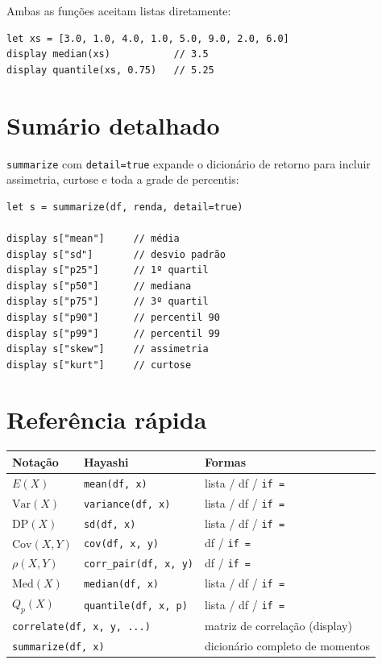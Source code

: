 Ambas as funções aceitam listas diretamente:

\begin{lstlisting}
let xs = [3.0, 1.0, 4.0, 1.0, 5.0, 9.0, 2.0, 6.0]
display median(xs)           // 3.5
display quantile(xs, 0.75)   // 5.25
\end{lstlisting}

\section{Sumário detalhado}

\lstinline{summarize} com \lstinline{detail=true} expande o dicionário de
retorno para incluir assimetria, curtose e toda a grade de percentis:

\begin{lstlisting}[caption={summarize com detail}]
let s = summarize(df, renda, detail=true)

display s["mean"]     // média
display s["sd"]       // desvio padrão
display s["p25"]      // 1º quartil
display s["p50"]      // mediana
display s["p75"]      // 3º quartil
display s["p90"]      // percentil 90
display s["p99"]      // percentil 99
display s["skew"]     // assimetria
display s["kurt"]     // curtose
\end{lstlisting}

\section{Referência rápida}

\begin{center}
\begin{tabular}{lll}
\toprule
\textbf{Notação} & \textbf{Hayashi} & \textbf{Formas} \\
\midrule
$E(X)$
  & \lstinline{mean(df, x)}
  & lista / df / \lstinline{if =} \\
$\mathrm{Var}(X)$
  & \lstinline{variance(df, x)}
  & lista / df / \lstinline{if =} \\
$\mathrm{DP}(X)$
  & \lstinline{sd(df, x)}
  & lista / df / \lstinline{if =} \\
$\mathrm{Cov}(X, Y)$
  & \lstinline{cov(df, x, y)}
  & df / \lstinline{if =} \\
$\rho(X, Y)$
  & \lstinline{corr_pair(df, x, y)}
  & df / \lstinline{if =} \\
$\mathrm{Med}(X)$
  & \lstinline{median(df, x)}
  & lista / df / \lstinline{if =} \\
$Q_p(X)$
  & \lstinline{quantile(df, x, p)}
  & lista / df / \lstinline{if =} \\
\midrule
\multicolumn{2}{l}{\lstinline{correlate(df, x, y, ...)}}
  & matriz de correlação (display) \\
\multicolumn{2}{l}{\lstinline{summarize(df, x)}}
  & dicionário completo de momentos \\
\bottomrule
\end{tabular}
\end{center}

